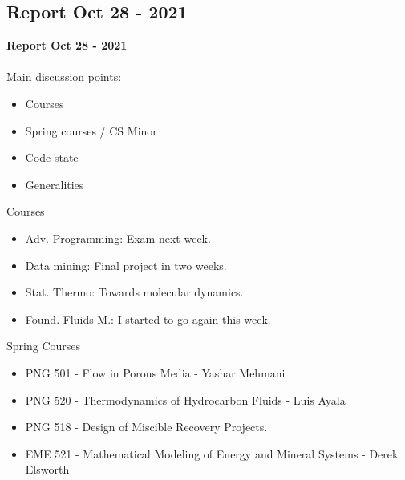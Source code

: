 \documentclass{beamer}
\begin{document}
	

	\subsection{Report Oct 28 - 2021}
	\justifying
	\begin{frame}
		\textbf{Report Oct 28 - 2021}\\~\\
		Main discussion points:
		\begin{itemize}
			\item Courses
			\item Spring courses / CS Minor
			\item Code state
			\item Generalities
		\end{itemize}
	\end{frame}
	
	\begin{frame}{Courses}
		\begin{itemize}
			\item Adv. Programming: Exam next week.
			\item Data mining: Final project in two weeks.
			\item Stat. Thermo: Towards molecular dynamics.
			\item Found. Fluids M.: I started to go again this week.
		\end{itemize}
	\end{frame}

	\begin{frame}{Spring Courses}
		\begin{itemize}
			\item PNG 501 - Flow in Porous Media - Yashar Mehmani
			\item PNG 520 - Thermodynamics of Hydrocarbon Fluids - Luis Ayala
			\item PNG 518 - Design of Miscible Recovery Projects.
			\item EME 521 - Mathematical Modeling of Energy and Mineral Systems - Derek Elsworth
		\end{itemize}
	\end{frame}
\end{document}
